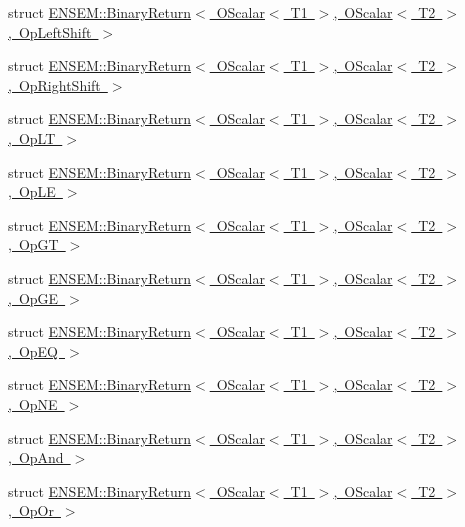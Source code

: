 \begin{DoxyCompactItemize}
\item 
struct \mbox{\hyperlink{structENSEM_1_1BinaryReturn_3_01OScalar_3_01T1_01_4_00_01OScalar_3_01T2_01_4_00_01OpLeftShift_01_4}{E\+N\+S\+E\+M\+::\+Binary\+Return$<$ O\+Scalar$<$ T1 $>$, O\+Scalar$<$ T2 $>$, Op\+Left\+Shift $>$}}
\item 
struct \mbox{\hyperlink{structENSEM_1_1BinaryReturn_3_01OScalar_3_01T1_01_4_00_01OScalar_3_01T2_01_4_00_01OpRightShift_01_4}{E\+N\+S\+E\+M\+::\+Binary\+Return$<$ O\+Scalar$<$ T1 $>$, O\+Scalar$<$ T2 $>$, Op\+Right\+Shift $>$}}
\item 
struct \mbox{\hyperlink{structENSEM_1_1BinaryReturn_3_01OScalar_3_01T1_01_4_00_01OScalar_3_01T2_01_4_00_01OpLT_01_4}{E\+N\+S\+E\+M\+::\+Binary\+Return$<$ O\+Scalar$<$ T1 $>$, O\+Scalar$<$ T2 $>$, Op\+L\+T $>$}}
\item 
struct \mbox{\hyperlink{structENSEM_1_1BinaryReturn_3_01OScalar_3_01T1_01_4_00_01OScalar_3_01T2_01_4_00_01OpLE_01_4}{E\+N\+S\+E\+M\+::\+Binary\+Return$<$ O\+Scalar$<$ T1 $>$, O\+Scalar$<$ T2 $>$, Op\+L\+E $>$}}
\item 
struct \mbox{\hyperlink{structENSEM_1_1BinaryReturn_3_01OScalar_3_01T1_01_4_00_01OScalar_3_01T2_01_4_00_01OpGT_01_4}{E\+N\+S\+E\+M\+::\+Binary\+Return$<$ O\+Scalar$<$ T1 $>$, O\+Scalar$<$ T2 $>$, Op\+G\+T $>$}}
\item 
struct \mbox{\hyperlink{structENSEM_1_1BinaryReturn_3_01OScalar_3_01T1_01_4_00_01OScalar_3_01T2_01_4_00_01OpGE_01_4}{E\+N\+S\+E\+M\+::\+Binary\+Return$<$ O\+Scalar$<$ T1 $>$, O\+Scalar$<$ T2 $>$, Op\+G\+E $>$}}
\item 
struct \mbox{\hyperlink{structENSEM_1_1BinaryReturn_3_01OScalar_3_01T1_01_4_00_01OScalar_3_01T2_01_4_00_01OpEQ_01_4}{E\+N\+S\+E\+M\+::\+Binary\+Return$<$ O\+Scalar$<$ T1 $>$, O\+Scalar$<$ T2 $>$, Op\+E\+Q $>$}}
\item 
struct \mbox{\hyperlink{structENSEM_1_1BinaryReturn_3_01OScalar_3_01T1_01_4_00_01OScalar_3_01T2_01_4_00_01OpNE_01_4}{E\+N\+S\+E\+M\+::\+Binary\+Return$<$ O\+Scalar$<$ T1 $>$, O\+Scalar$<$ T2 $>$, Op\+N\+E $>$}}
\item 
struct \mbox{\hyperlink{structENSEM_1_1BinaryReturn_3_01OScalar_3_01T1_01_4_00_01OScalar_3_01T2_01_4_00_01OpAnd_01_4}{E\+N\+S\+E\+M\+::\+Binary\+Return$<$ O\+Scalar$<$ T1 $>$, O\+Scalar$<$ T2 $>$, Op\+And $>$}}
\item 
struct \mbox{\hyperlink{structENSEM_1_1BinaryReturn_3_01OScalar_3_01T1_01_4_00_01OScalar_3_01T2_01_4_00_01OpOr_01_4}{E\+N\+S\+E\+M\+::\+Binary\+Return$<$ O\+Scalar$<$ T1 $>$, O\+Scalar$<$ T2 $>$, Op\+Or $>$}}

\end{DoxyCompactItemize}
